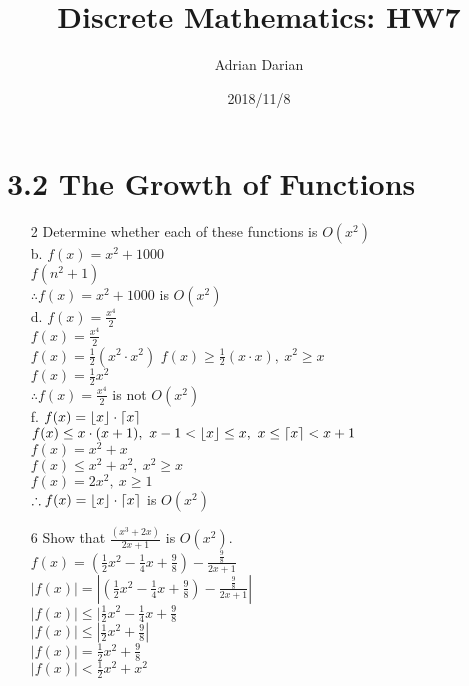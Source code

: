 \documentclass[a4paper]{article}
\title{Discrete Mathematics: HW7}
\author{Adrian Darian}
\date{2018/11/8}
\newcommand\tab[1][0.5cm]{\hspace*{#1}}
\DeclarePairedDelimiter\ceil{\lceil}{\rceil}
\DeclarePairedDelimiter\floor{\lfloor}{\rfloor}
\begin{document}
  
  \maketitle
  
  \section*{3.2 The Growth of Functions}
  \begin{itemize}
    \item[2] Determine whether each of these functions is $O(x^2)$ \\
      b. $f(x) = x^2 + 1000$ \\
      \tab $f(n^2 + 1)$ \\
      \tab $\therefore f(x) = x^2 + 1000$ is $O(x^2)$ \\
      d. $f(x) = \frac{x^4}{2}$ \\
      \tab $f(x) = \frac{x^4}{2}$ \\
      \tab $f(x) = \frac{1}{2}(x^2 \cdot x^2)$
      \tab $f(x) \geq \frac{1}{2}(x \cdot x),\ x^2 \geq x$ \\
      \tab $f(x) = \frac{1}{2}x^2$ \\
      \tab $\therefore f(x) = \frac{x^4}{2}$ is not $O(x^2)$ \\
      f. $f(x) = \floor{x} \cdot \ceil{x}$ \\
      \tab $f(x) \leq x \cdot (x + 1),\ x - 1 < \floor{x} \leq x,\ x \leq \ceil{x} < x + 1$ \\
      \tab $f(x) = x^2 + x$ \\
      \tab $f(x) \leq x^2 + x^2,\ x^2 \geq x$ \\
      \tab $f(x) = 2x^2,\ x \geq 1$ \\
      \tab $\therefore f(x) = \floor{x} \cdot \ceil{x}$ is $O(x^2)$
    \item[6] Show that $\frac{(x^3 + 2x)}{2x + 1}$ is $O(x^2)$. \\
    \tab $f(x) = (\frac{1}{2}x^2 - \frac{1}{4}x + \frac{9}{8}) - \frac{\frac{9}{8}}{2x + 1}$ \\
    \tab $|f(x)| = |(\frac{1}{2}x^2 - \frac{1}{4}x + \frac{9}{8}) - \frac{\frac{9}{8}}{2x + 1}|$ \\
    \tab $|f(x)| \leq |\frac{1}{2}x^2 - \frac{1}{4}x + \frac{9}{8}$ \\
    \tab $|f(x)| \leq |\frac{1}{2}x^2 + \frac{9}{8}|$ \\
    \tab $|f(x)| = \frac{1}{2}x^2 + \frac{9}{8}$ \\
    \tab $|f(x)| < \frac{1}{2}x^2 + x^2$ \\

\end{itemize}
\end{document}
